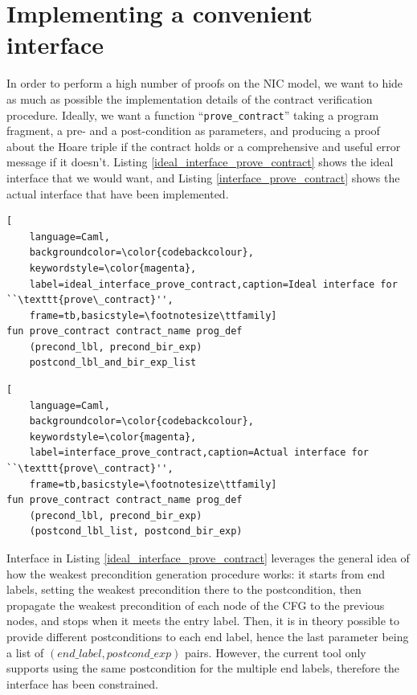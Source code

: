 \documentclass{kththesis}
\begin{document}
{%

\section{Implementing a convenient interface} \label{impl_convenient_ht_interface}

In order to perform a high number of proofs on the \gls{NIC} model, we want to hide as much as possible the implementation details of the contract verification procedure. Ideally, we want a function ``\texttt{prove\_contract}'' taking a program fragment, a pre- and a post-condition as parameters, and producing a proof about the Hoare triple if the contract holds or a comprehensive and useful error message if it doesn't. Listing \ref{ideal_interface_prove_contract} shows the ideal interface that we would want, and Listing \ref{interface_prove_contract} shows the actual interface that have been implemented.

\begin{lstlisting}[
    language=Caml,
    backgroundcolor=\color{codebackcolour},
    keywordstyle=\color{magenta},
    label=ideal_interface_prove_contract,caption=Ideal interface for ``\texttt{prove\_contract}'',
    frame=tb,basicstyle=\footnotesize\ttfamily]
fun prove_contract contract_name prog_def
    (precond_lbl, precond_bir_exp)
    postcond_lbl_and_bir_exp_list
\end{lstlisting}

\begin{lstlisting}[
    language=Caml,
    backgroundcolor=\color{codebackcolour},
    keywordstyle=\color{magenta},
    label=interface_prove_contract,caption=Actual interface for ``\texttt{prove\_contract}'',
    frame=tb,basicstyle=\footnotesize\ttfamily]
fun prove_contract contract_name prog_def
    (precond_lbl, precond_bir_exp)
    (postcond_lbl_list, postcond_bir_exp)
\end{lstlisting}

Interface in Listing \ref{ideal_interface_prove_contract} leverages the general idea of how the weakest precondition generation procedure works: it starts from end labels, setting the weakest precondition there to the postcondition, then propagate the weakest precondition of each node of the \gls{CFG} to the previous nodes, and stops when it meets the entry label. Then, it is in theory possible to provide different postconditions to each end label, hence the last parameter being a list of $(end\_label, postcond\_exp)$ pairs. However, the current tool only supports using the same postcondition for the multiple end labels, therefore the interface has been constrained\footnotemark.

}
\end{document}
